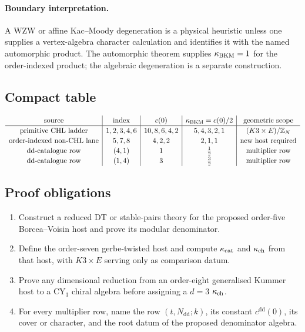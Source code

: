 \paragraph{Boundary interpretation.}
A WZW or affine Kac--Moody degeneration is a physical heuristic unless
one supplies a vertex-algebra character calculation and identifies it
with the named automorphic product.  The automorphic theorem supplies
\(\kappa_{\mathrm{BKM}}=1\) for the order-indexed product; the algebraic
degeneration is a separate construction.

\subsection*{Compact table}

\[
\renewcommand{\arraystretch}{1.15}
\begin{array}{c|c|c|c|c}
\text{source} & \text{index} & c(0) & \kBKM=c(0)/2 & \text{geometric scope}\\
\hline
\text{primitive CHL ladder} & 1,2,3,4,6 & 10,8,6,4,2
  & 5,4,3,2,1 & (K3\times E)/\Z_N\\
\text{order-indexed non-CHL lane} & 5,7,8 & 4,2,2
  & 2,1,1 & \text{new host required}\\
\text{dd-catalogue row} & (4,1) & 1
  & \tfrac12 & \text{multiplier row}\\
\text{dd-catalogue row} & (1,4) & 3
  & \tfrac32 & \text{multiplier row}
\end{array}
\]

\subsection*{Proof obligations}

\begin{enumerate}
\item Construct a reduced DT or stable-pairs theory for the proposed
order-five Borcea--Voisin host and prove its modular denominator.
\item Define the order-seven gerbe-twisted host and compute
\(\kappa_{\mathrm{cat}}\) and \(\kappa_{\mathrm{ch}}\) from that host, with \(K3\times E\) serving only
as comparison datum.
\item Prove any dimensional reduction from an order-eight generalised
Kummer host to a CY$_3$ chiral algebra before assigning a \(d=3\)
\(\kappa_{\mathrm{ch}}\).
\item For every multiplier row, name the row \((t,N_{\mathrm{dd}};k)\),
its constant \(c^{\mathrm{dd}}(0)\), its cover or character, and the
root datum of the proposed denominator algebra.
\end{enumerate}

